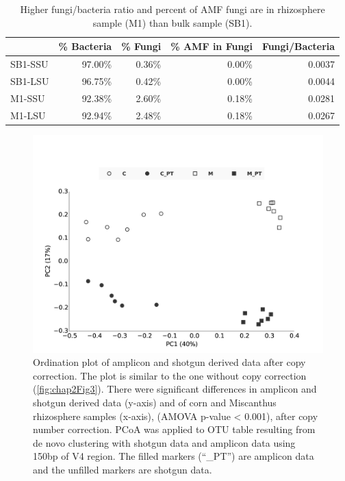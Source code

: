 \documentclass[]{msu-thesis}
\begin{document}
\begin{table}[phtb]
  \centering
  \caption[Fungi/bacteria ratio and percent of AMF fungi in rhizosphere and bulk soil samples]{Higher fungi/bacteria ratio and percent of AMF fungi are in rhizosphere sample (M1) than bulk sample (SB1).}
    \begin{tabular}{|l|r|r|r|r|}
    \toprule
          & \multicolumn{1}{l|}{\% Bacteria} & \multicolumn{1}{l|}{\% Fungi} & \multicolumn{1}{l|}{\% AMF in Fungi} & \multicolumn{1}{l|}{Fungi/Bacteria} \\
    \midrule
    SB1-SSU & 97.00\% & 0.36\% & 0.00\% & 0.0037 \\
    \midrule
    SB1-LSU & 96.75\% & 0.42\% & 0.00\% & 0.0044 \\
    \midrule
    M1-SSU & 92.38\% & 2.60\% & 0.18\% & 0.0281 \\
    \midrule
    M1-LSU & 92.94\% & 2.48\% & 0.18\% & 0.0267 \\
    \bottomrule
    \end{tabular}%
  \label{tab:chap2TabS1}%
\end{table}%


\begin{figure}[tbph!]
  \centering
  \includegraphics[width=1\textwidth]{figs/chap2_figS9}
  \caption[Ordination plot of amplicon and shotgun derived data after copy correction]{Ordination plot of amplicon and shotgun derived data after copy correction. The plot is similar to the one without copy correction (\cref{fig:chap2Fig3}). There were significant differences in amplicon and shotgun derived data (y-axis) and of corn and Miscanthus rhizosphere samples (x-axis), (AMOVA p-value < 0.001), after copy number correction. PCoA was applied to OTU table resulting from de novo clustering with shotgun data and amplicon data using 150bp of V4 region. The filled markers (``\_PT'') are amplicon data and the unfilled markers are shotgun data.}
  \label{fig:chap2FigS9}
\end{figure}
\end{document}
